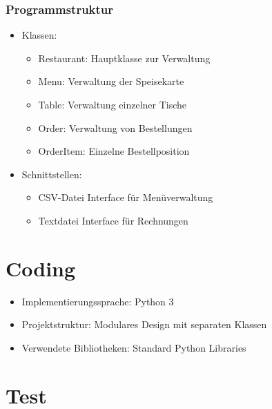 \documentclass[a4paper,11pt]{article}
\begin{document}
\subsubsection{Programmstruktur}
\begin{itemize}
    \item Klassen:
    \begin{itemize}
        \item Restaurant: Hauptklasse zur Verwaltung
        \item Menu: Verwaltung der Speisekarte
        \item Table: Verwaltung einzelner Tische
        \item Order: Verwaltung von Bestellungen
        \item OrderItem: Einzelne Bestellposition
    \end{itemize}
    \item Schnittstellen:
    \begin{itemize}
        \item CSV-Datei Interface für Menüverwaltung
        \item Textdatei Interface für Rechnungen
    \end{itemize}
\end{itemize}

\section{Coding}
\begin{itemize}
    \item Implementierungssprache: Python 3
    \item Projektstruktur: Modulares Design mit separaten Klassen
    \item Verwendete Bibliotheken: Standard Python Libraries
\end{itemize}

\section{Test}
\end{document}
